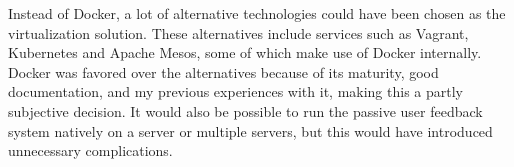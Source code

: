 Instead of Docker, a lot of alternative technologies could have been chosen as the virtualization solution.
These alternatives include services such as Vagrant, Kubernetes and Apache Mesos, some of which make use of Docker internally.
Docker was favored over the alternatives because of its maturity, good documentation, and my previous experiences with it, making this a partly subjective decision.
It would also be possible to run the passive user feedback system natively on a server or multiple servers, but this would have introduced unnecessary complications.